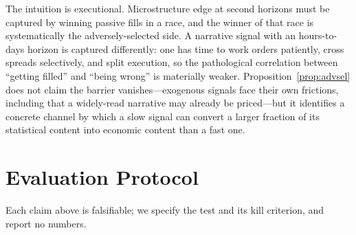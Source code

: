 \documentclass[11pt,a4paper]{article}
\theoremstyle{definition}
\theoremstyle{plain}
\begin{document}
The intuition is executional. Microstructure edge at second horizons must be captured by winning
passive fills in a race, and the winner of that race is systematically the adversely-selected side. A
narrative signal with an hours-to-days horizon is captured differently: one has time to work orders
patiently, cross spreads selectively, and split execution, so the pathological correlation between
``getting filled'' and ``being wrong'' is materially weaker. Proposition~\ref{prop:advsel} does not
claim the barrier vanishes---exogenous signals face their own frictions, including that a widely-read
narrative may already be priced---but it identifies a concrete channel by which a slow signal can
convert a larger fraction of its statistical content into economic content than a fast one.

\section{Evaluation Protocol}
\label{sec:eval}

Each claim above is falsifiable; we specify the test and its kill criterion, and report no numbers.
\end{document}

